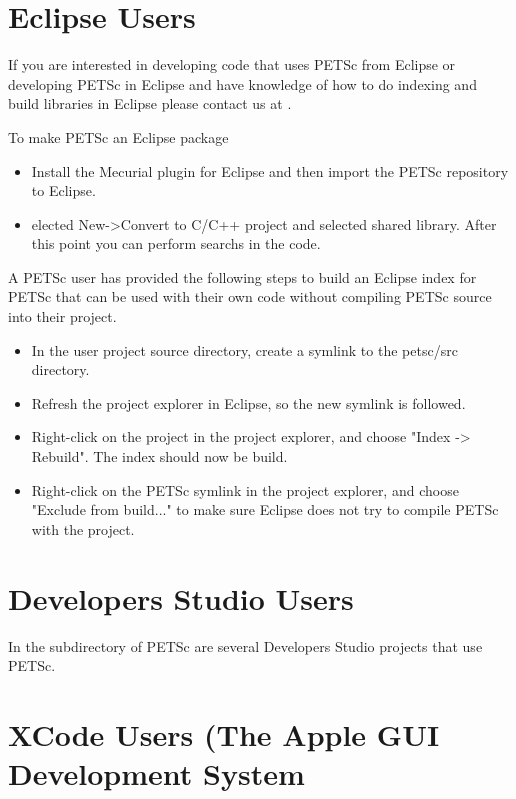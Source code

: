 {{{\section{Eclipse Users} 

If you are interested in developing code that uses PETSc from Eclipse or developing PETSc in Eclipse and have knowledge of how to do indexing and build libraries in Eclipse please contact us at .

To make PETSc an Eclipse package
\begin{itemize}
\item Install the Mecurial plugin for Eclipse and then import the PETSc repository to Eclipse.
\item elected New->Convert to C/C++ project and selected shared library. After this point you can perform searchs in the code.
\end{itemize}

  A PETSc user has provided the following steps to build an Eclipse index for PETSc that can be used with their own code without compiling PETSc source into their project. 
\begin{itemize}
\item In the user project source directory, create a symlink to the petsc/src directory. 
\item Refresh the project explorer in Eclipse, so the new symlink is followed.
\item Right-click on the project in the project explorer, and choose "Index -> Rebuild". The index should now be build.
\item Right-click on the PETSc symlink in the project explorer, and choose "Exclude from build..." to make sure Eclipse does not try to compile PETSc with the project.
\end{itemize}

\section{Developers Studio Users} 

In the  subdirectory of PETSc are several Developers Studio projects that use PETSc.

\section{XCode Users (The Apple GUI Development System} 

}}}
